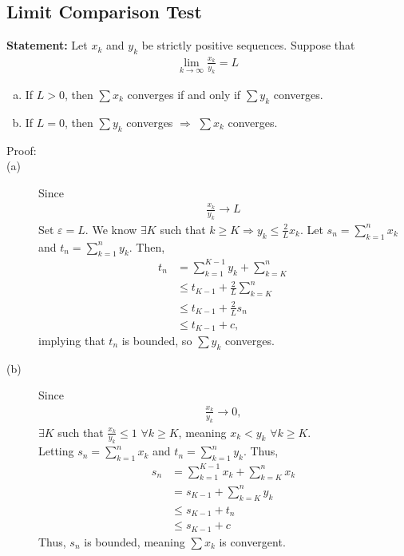 \documentclass[10pt]{extarticle}
\begin{document}
  \subsection{Limit Comparison Test}%
  \textbf{Statement:} Let $x_k$ and $y_k$ be strictly positive sequences. Suppose that
    \begin{align*}
      \lim_{k\rightarrow\infty}\frac{x_k}{y_k} = L
    \end{align*}
    \begin{enumerate}[(a)]
      \item If $L > 0$, then $\sum x_k$ converges if and only if $\sum y_k$ converges.
      \item If $L = 0$, then $\sum y_k$ converges $ \Rightarrow$  $\sum x_k$ converges.
    \end{enumerate}
    \begin{description}
      \item[Proof:]\hfill
      \item[{\normalfont (a)}] Since
        \begin{align*}
          \frac{x_k}{y_k} \rightarrow L
        \end{align*}
        Set $\varepsilon = L$. We know $\exists K$ such that $k\geq K \Rightarrow y_k \leq \frac{2}{L}x_k$. Let $s_n = \sum_{k=1}^{n}x_k$ and $t_n = \sum_{k=1}^{n}y_k$. Then,
        \begin{align*}
          t_n &= \sum_{k=1}^{K-1}y_k + \sum_{k=K}^{n}\\
              &\leq t_{K-1} + \frac{2}{L} \sum_{k=K}^{n}\\
              &\leq t_{K-1} + \frac{2}{L} s_n\\
              &\leq t_{K-1} + c,
        \end{align*}
        implying that $t_n$ is bounded, so $\sum y_k$ converges.
      \item[{\normalfont (b)}] Since
        \begin{align*}
          \frac{x_k}{y_k} \rightarrow 0,
        \end{align*}
        $\exists K$ such that $\frac{x_k}{y_k} \leq 1$ $\forall k \geq K$, meaning $x_k < y_k$ $\forall k \geq K$.\\

        Letting $s_n = \sum_{k=1}^{n}x_k$ and $t_n = \sum_{k=1}^{n} y_k$. Thus,
        \begin{align*}
          s_n &= \sum_{k=1}^{K-1}x_k + \sum_{k=K}^{n} x_k\\
              &= s_{K-1} + \sum_{k=K}^{n}y_k\\
              &\leq s_{K-1} + t_n\\
              &\leq s_{K-1} + c
        \end{align*}
        Thus, $s_n$ is bounded, meaning $\sum x_k$ is convergent.
    \end{description}
\end{document}

